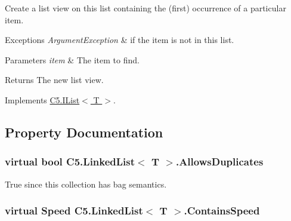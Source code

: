 Create a list view on this list containing the (first) occurrence of a particular item. 


\begin{DoxyExceptions}{Exceptions}
{\em Argument\+Exception} & if the item is not in this list.\\
\hline
\end{DoxyExceptions}

\begin{DoxyParams}{Parameters}
{\em item} & The item to find.\\
\hline
\end{DoxyParams}
\begin{DoxyReturn}{Returns}
The new list view.
\end{DoxyReturn}


Implements \hyperlink{interface_c5_1_1_i_list_aefcdef9983913d18ae05394e77a44c71}{C5.\+I\+List$<$ T $>$}.



\subsection{Property Documentation}
\hypertarget{class_c5_1_1_linked_list_a07b967b548ad97faa21e20f323386152}{}
\subsubsection[{Allows\+Duplicates}]{\setlength{\rightskip}{0pt plus 5cm}virtual bool {\bf C5.\+Linked\+List}$<$ T $>$.Allows\+Duplicates\hspace{0.3cm}{\ttfamily [get]}}\label{class_c5_1_1_linked_list_a07b967b548ad97faa21e20f323386152}




True since this collection has bag semantics.\hypertarget{class_c5_1_1_linked_list_a176ab1eedbdc470f2eead863ce10b0d1}{}
\subsubsection[{Contains\+Speed}]{\setlength{\rightskip}{0pt plus 5cm}virtual {\bf Speed} {\bf C5.\+Linked\+List}$<$ T $>$.Contains\+Speed\hspace{0.3cm}{\ttfamily [get]}}\label{class_c5_1_1_linked_list_a176ab1eedbdc470f2eead863ce10b0d1}


